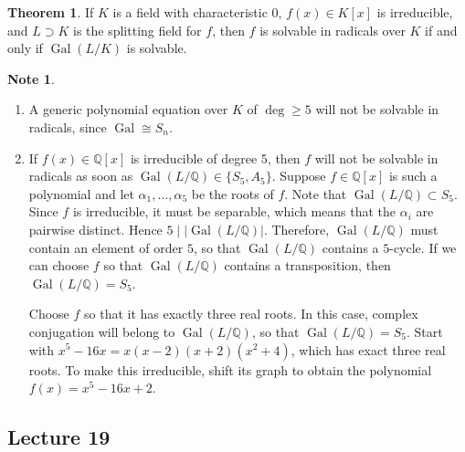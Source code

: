 \documentclass[10pt,letterpaper,cm]{nupset}
\theoremstyle{definition}
\newtheorem{note}{Note}
\newtheorem{theorem}{Theorem}
\newcommand{\Q}{\mathbb Q}
\newcommand{\1}{\mathbf{1}}
\newcommand{\0}{\vec 0}
\DeclareMathOperator{\gal}{Gal}
\begin{document}
\begin{theorem}
If $K$ is a field with characteristic $0$, $f(x) \in K[x]$ is irreducible, and $L \supset K$ is the splitting field for $f$, then  $f$ is solvable in radicals over $K$ if and only if $\gal(L/K)$ is solvable. 
\end{theorem}

\begin{note} $ $
\begin{enumerate}
\item A generic polynomial equation over $K$ of $\deg \geq 5$ will not be solvable in radicals, since $\gal \cong S_n$.
\item If $f(x) \in \Q[x]$ is irreducible of degree $5$, then $f$ will not be solvable in radicals as soon as $\gal(L/\Q) \in \{S_5, A_5\}$. Suppose $f \in \Q[x]$ is such a polynomial and let $\alpha_1, \ldots, \alpha_5$ be the roots of $f$. Note that $\gal(L/\Q) \subset S_5$. Since  $f$ is irreducible, it must be separable, which means that the $\alpha_i$ are pairwise distinct. Hence $5 \mid |\gal(L/\Q)|$. Therefore, $\gal(L/\Q)$ must contain an element of order $5$, so that $\gal(L/\Q)$ contains a $5$-cycle. If we can choose $f$ so that $\gal(L/\Q)$ contains a transposition, then $\gal(L/\Q) = S_5$.  

Choose $f$ so that it has exactly three real roots. In this case, complex conjugation will belong to $\gal(L/\Q)$, so that $\gal(L/\Q) = S_5$. Start with $x^5-16x = x(x-2)(x+2)(x^2 +4)$, which has exact three real roots. To make this irreducible, shift its graph to obtain the polynomial $f(x) = x^5 -16x +2$.
\end{enumerate}
\end{note}

\subsection{Lecture 19}
\end{document}
